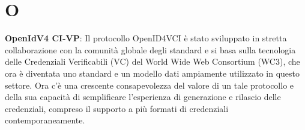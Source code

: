 \section{O}
\textbf{OpenIdV4 CI-VP}: Il protocollo OpenID4VCI è stato sviluppato in stretta collaborazione con la comunità globale degli standard e si basa sulla tecnologia delle Credenziali Verificabili (VC) del World Wide Web Consortium (WC3), che ora è diventata uno standard e un modello dati ampiamente utilizzato in questo settore. Ora c'è una crescente consapevolezza del valore di un tale protocollo e della sua capacità di semplificare l'esperienza di generazione e rilascio delle credenziali, compreso il supporto a più formati di credenziali contemporaneamente.\\